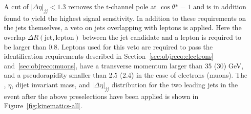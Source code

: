 A cut of $|\Delta \eta|_{jj}<1.3$ removes the t-channel pole at $\cos \theta* = 1$ and is in addition found to yield the highest signal sensitivity. In addition to these requirements on the jets themselves, a veto on jets overlapping with leptons is applied. Here the overlap $\Delta R(\text{jet},\text{lepton})$ between the jet candidate and a lepton is required to be larger than 0.8. Leptons used for this veto are required to pass the identification requirements described in Section~\ref{sec:objreco:electrons} and~\ref{sec:objreco:muons}, have a transverse momentum larger than 35 (30) GeV, and a pseudorapidity smaller than 2.5 (2.4) in the case of electrons (muons). The \PT, $\eta$, dijet invariant mass, and $|\Delta \eta|_{jj}$ distribution for the two leading jets in the event after the above preselections have been applied is shown in Figure~\ref{fig:kinematics-all}.

